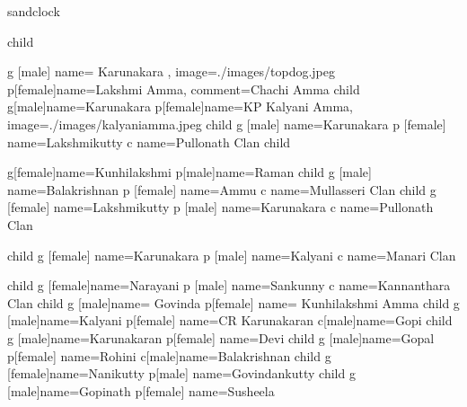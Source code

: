 \documentclass{article}
\begin{document}
\begin{landscape}
\begin{genealogypicture} [
processing=database,
database format=medium marriage below,
node size=2.4cm,
level size=3.5cm,
level distance=6mm,
list separators hang,
name font=\bfseries,
surn code={\textcolor{red!50!black}{#1}},
place text={\newline}{},
date format=d/mon/yyyy,
tcbset={male/.style={colframe=blue,colback=blue!5},
female/.style={colframe=red,colback=red!5}},
box={fit basedim=7pt,boxsep=2pt,segmentation style=solid,
halign=left,before upper=\parskip1pt,
\gtrDBsex,drop fuzzy shadow,
if image defined={add to width=25mm,right=25mm,
underlay={\begin{tcbclipinterior}\path[fill overzoom DBimage]
([xshift=-24mm]interior.south east) rectangle (interior.north east);
\end{tcbclipinterior}},
}{},
},
]

sandclock {
	child {
  		g [male]  {name={ Karunakara }, image={./images/topdog.jpeg}}
  		p[female]{name={Lakshmi Amma}, comment={Chachi Amma}}
  		child {
  			 g[male]{name=Karunakara }
   			p[female]{name={KP Kalyani Amma}, image={./images/kalyaniamma.jpeg}}
   			child {
    				g [male] {name=Karunakara }
    				p [female] {name=Lakshmikutty }
				c {name=Pullonath Clan}
   			}
  		}
  		child {
   			g[female]{name={Kunhilakshmi }}
   			p[male]{name={Raman }}
   			child {
    				g [male] {name=Balakrishnan }
    				p [female] {name=Ammu}
				c {name=Mullasseri Clan}
   			}
			child {
    				g [female] {name=Lakshmikutty }
				p [male] {name=Karunakara }
				c {name=Pullonath Clan}
   			}

			child {
    				g [female] {name=Karunakara }
				p [male] {name=Kalyani}
				c {name=Manari Clan}
   			}
  		}
  		child {
   			g [female]{name={Narayani }}
   			p [male] {name={Sankunny }}
			c {name=Kannanthara Clan}
  		}
  		child {
   			g [male]{name={ Govinda }}
   			p[female] {name={ Kunhilakshmi Amma}}
			child {
   				g [male]{name=Kalyani}
   				p[female] {name=CR Karunakaran}
  			}
			c[male]{name=Gopi}
			child {
   				g [male]{name=Karunakaran}
   				p[female] {name=Devi}
  			}
			child {
   				g [male]{name=Gopal}
   				p[female] {name=Rohini}
  			}
			c[male]{name=Balakrishnan}
			child {
   				g [female]{name=Nanikutty}
   				p[male] {name=Govindankutty}
  			}
			child {
   				g [male]{name=Gopinath}
   				p[female] {name=Susheela}
  			}
  		}
	}
}

\end{genealogypicture}

\end{landscape}
\end{document}
